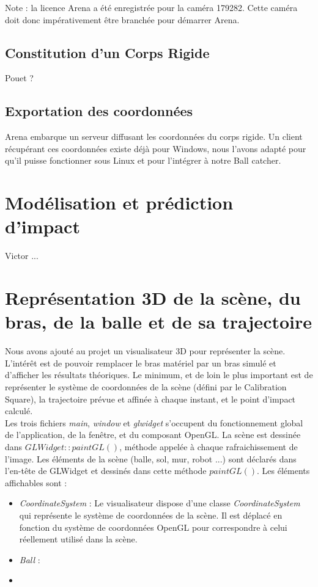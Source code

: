\documentclass{article}[11pt]
\begin{document}
Note : la licence Arena a été enregistrée pour la caméra 179282. Cette caméra doit donc impérativement être branchée pour démarrer Arena.

\subsection{Constitution d'un Corps Rigide}

Pouet ?

\subsection{Exportation des coordonnées}

Arena embarque un serveur diffusant les coordonnées du corps rigide. Un client récupérant ces coordonnées existe déjà pour Windows, nous l'avons adapté pour qu'il puisse fonctionner sous Linux et pour l'intégrer à notre Ball catcher. 

\section{Modélisation et prédiction d'impact}
Victor ...

\section{Représentation 3D de la scène, du bras, de la balle et de sa trajectoire}

Nous avons ajouté au projet un visualisateur 3D pour représenter la scène. L'intérêt est de pouvoir remplacer le bras matériel par un bras simulé et d'afficher les résultats théoriques. Le minimum, et de loin le plus important est de représenter le système de coordonnées de la scène (défini par le Calibration Square), la trajectoire prévue et affinée à chaque instant, et le point d'impact calculé. \\

Les trois fichiers \textit{main}, \textit{window} et \textit{glwidget} s'occupent du fonctionnement global de l'application, de la fenêtre, et du composant OpenGL. La scène est dessinée dans $GLWidget::paintGL()$, méthode appelée à chaque rafraichissement de l'image. Les éléments de la scène (balle, sol, mur, robot ...) sont déclarés dans l'en-tête de GLWidget et dessinés dans cette méthode $paintGL()$. Les éléments affichables sont :\\

\begin{itemize}
\item \textit{CoordinateSystem} : Le visualisateur dispose d'une classe \textit{CoordinateSystem} qui représente le système de coordonnées de la scène. Il est déplacé en fonction du système de coordonnées OpenGL pour correspondre à celui réellement utilisé dans la scène.
\item \textit{Ball} : 
\item 
\end{itemize}
\end{document}
